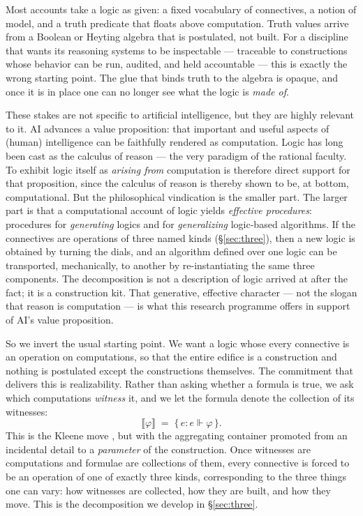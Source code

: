 \documentclass[11pt]{article}
\theoremstyle{definition}
\theoremstyle{plain}
\newcommand{\sem}[1]{\llbracket #1 \rrbracket}
\newcommand{\real}{\Vdash}
\begin{document}
Most accounts take a logic as given: a fixed vocabulary of connectives, a
notion of model, and a truth predicate that floats above computation. Truth
values arrive from a Boolean or Heyting algebra that is postulated, not built.
For a discipline that wants its reasoning systems to be inspectable ---
traceable to constructions whose behavior can be run, audited, and held
accountable --- this is exactly the wrong starting point. The glue that binds
truth to the algebra is opaque, and once it is in place one can no longer see
what the logic is \emph{made of}.

These stakes are not specific to artificial intelligence, but they are highly
relevant to it. AI advances a value
proposition: that important and useful aspects of (human) intelligence can be
faithfully rendered as computation. Logic has long been cast as the calculus
of reason --- the very paradigm of the rational faculty. To exhibit logic
itself as \emph{arising from} computation is therefore direct support for that
proposition, since the calculus of reason is thereby shown to be, at bottom,
computational. But the philosophical vindication is the smaller part. The
larger part is that a computational account of logic yields \emph{effective
procedures}: procedures for \emph{generating} logics and for
\emph{generalizing} logic-based algorithms. If the connectives are operations
of three named kinds (\S\ref{sec:three}), then a new logic is obtained by
turning the dials, and an algorithm defined over one logic can be transported,
mechanically, to another by re-instantiating the same three components. The
decomposition is not a description of logic arrived at after the fact; it is a
construction kit. That generative, effective character --- not the slogan that
reason is computation --- is what this research programme offers in support of
AI's value proposition.

So we invert the usual starting point. We want a logic whose every connective is an operation on
computations, so that the entire edifice is a construction and nothing is
postulated except the constructions themselves. The commitment that delivers
this is realizability. Rather than asking whether a formula is true, we ask
which computations \emph{witness} it, and we let the formula denote the
collection of its witnesses:
\[
  \sem{\varphi} \;=\; \{\, e : e \real \varphi \,\}.
\]
This is the Kleene move \cite{Kleene45,vanOosten08}, but with the aggregating
container promoted from an incidental detail to a \emph{parameter} of the
construction. Once witnesses are computations and formulae are collections of
them, every connective is forced to be an operation of one of exactly three
kinds, corresponding to the three things one can vary: how witnesses are
collected, how they are built, and how they move. This is the decomposition
we develop in \S\ref{sec:three}.
\end{document}
